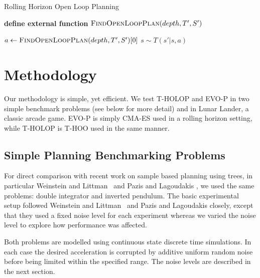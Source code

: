 \documentclass[conference]{IEEEtran}
\newcommand{\mathsc}[1]{{\normalfont\textsc{#1}}}
\begin{document}
\begin{algorithm}[!ht]
\caption{Rolling Horizon Open Loop Planning}\label{algo:ooop}
\begin{algorithmic}

\State 	\textbf{define external function} $\mathsc{FindOpenLoopPlan} (depth, T',S') $ 


	\Procedure{$\mathsc{OOP}$} {}
		    \State $a \gets \mathsc{FindOpenLoopPlan}(depth, T',S')[0]$ 
		    \State $s \sim T(s'|s,a)$ 
		\EndWhile
		\State
	\EndProcedure



\end{algorithmic}
\end{algorithm}


\section{Methodology} \label{sec:methodology}
Our methodology is simple, yet efficient. We test T-HOLOP and EVO-P in two simple benchmark problems (see below for more detail) and in Lunar Lander, a classic arcade game. EVO-P is simply CMA-ES used in a rolling horizon setting, while T-HOLOP is T-HOO used in the same manner.  


\subsection{Simple Planning Benchmarking Problems}





For direct comparison with recent work on sample based planning using trees, in particular
Weinstein and Littman~\cite{weinstein2012bandit} and Pazis and Lagoudakis \cite{PazisBAS},
we used the same problems: double integrator and inverted pendulum.  The basic
experimental setup followed Weinstein and Littman~\cite{weinstein2012bandit}
and Pazis and Lagoudakis \cite{PazisBAS}
closely, except that they used a fixed noise level for each experiment whereas we varied the
noise level to explore how performance was affected.

Both problems are modelled
using continuous state discrete time simulations.  In each case the desired
acceleration is corrupted by additive uniform random noise
before being limited within the specified range.  The noise levels are described in the next section.
\end{document}
